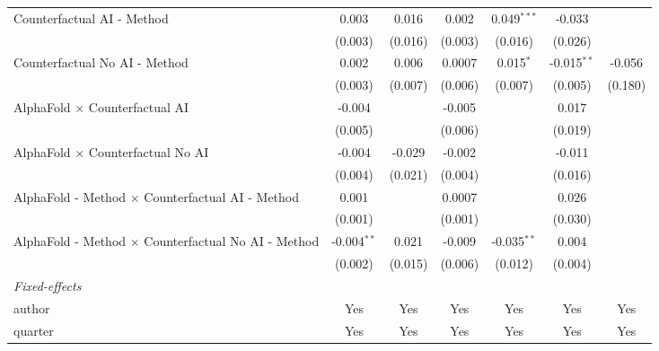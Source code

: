 \begin{tabular}{lcccccc}
   Counterfactual AI - Method                                 & 0.003         & 0.016   & 0.002   & 0.049$^{***}$ & -0.033        &   \\   
                                                              & (0.003)       & (0.016) & (0.003) & (0.016)       & (0.026)       &   \\   
   Counterfactual No AI - Method                              & 0.002         & 0.006   & 0.0007  & 0.015$^{*}$   & -0.015$^{**}$ & -0.056\\   
                                                              & (0.003)       & (0.007) & (0.006) & (0.007)       & (0.005)       & (0.180)\\   
   AlphaFold $\times$ Counterfactual AI                       & -0.004        &         & -0.005  &               & 0.017         &   \\   
                                                              & (0.005)       &         & (0.006) &               & (0.019)       &   \\   
   AlphaFold $\times$ Counterfactual No AI                    & -0.004        & -0.029  & -0.002  &               & -0.011        &   \\   
                                                              & (0.004)       & (0.021) & (0.004) &               & (0.016)       &   \\   
   AlphaFold - Method $\times$ Counterfactual AI - Method     & 0.001         &         & 0.0007  &               & 0.026         &   \\   
                                                              & (0.001)       &         & (0.001) &               & (0.030)       &   \\   
   AlphaFold - Method $\times$ Counterfactual No AI - Method  & -0.004$^{**}$ & 0.021   & -0.009  & -0.035$^{**}$ & 0.004         &   \\   
                                                              & (0.002)       & (0.015) & (0.006) & (0.012)       & (0.004)       &   \\   
   \midrule
   \emph{Fixed-effects}\\
   author                                                     & Yes           & Yes     & Yes     & Yes           & Yes           & Yes\\  
   quarter                                                    & Yes           & Yes     & Yes     & Yes           & Yes           & Yes\\  

\end{tabular}
